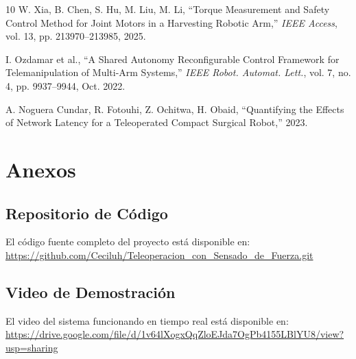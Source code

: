 \documentclass[journal,10pt,twoside]{IEEEtran}
\begin{document}
\begin{thebibliography}{10}
 W. Xia, B. Chen, S. Hu, M. Liu, M. Li, ``Torque Measurement and Safety Control Method for Joint Motors in a Harvesting Robotic Arm,'' \textit{IEEE Access}, vol. 13, pp. 213970--213985, 2025.

 I. Ozdamar et al., ``A Shared Autonomy Reconfigurable Control Framework for Telemanipulation of Multi-Arm Systems,'' \textit{IEEE Robot. Automat. Lett.}, vol. 7, no. 4, pp. 9937--9944, Oct. 2022.

 A. Noguera Cundar, R. Fotouhi, Z. Ochitwa, H. Obaid, ``Quantifying the Effects of Network Latency for a Teleoperated Compact Surgical Robot,'' 2023.

\end{thebibliography}

\section*{Anexos}

\subsection*{Repositorio de Código}
El código fuente completo del proyecto está disponible en:
\url{https://github.com/Ceciluh/Teleoperacion_con_Sensado_de_Fuerza.git}

\subsection*{Video de Demostración}
El video del sistema funcionando en tiempo real está disponible en:
\url{https://drive.google.com/file/d/1v64lXogxQqZloEJda7OgPb4155LBlYU8/view?usp=sharing }
\end{document}
